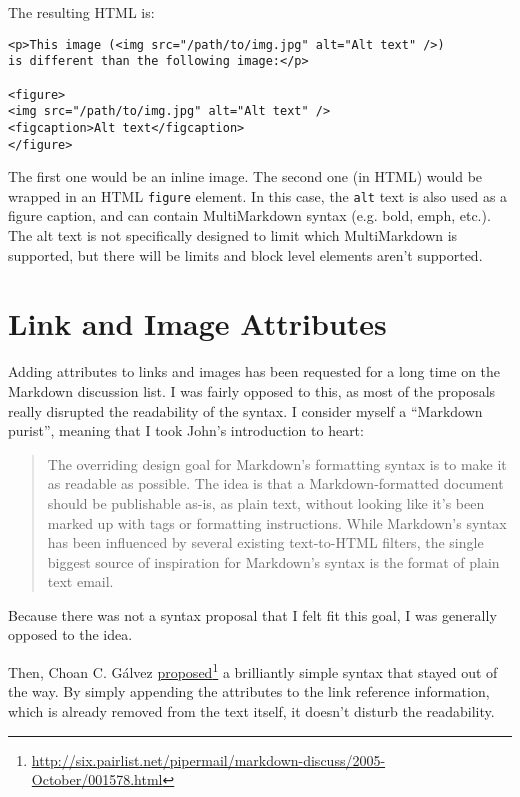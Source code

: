 The resulting HTML is:

\begin{verbatim}
<p>This image (<img src="/path/to/img.jpg" alt="Alt text" />)
is different than the following image:</p>

<figure>
<img src="/path/to/img.jpg" alt="Alt text" />
<figcaption>Alt text</figcaption>
</figure>
\end{verbatim}

The first one would be an inline image. The second one (in HTML) would be wrapped in an HTML \texttt{figure} element. In this case, the \texttt{alt} text is also used as a figure caption, and can contain MultiMarkdown syntax (e.g. bold, emph, etc.). The alt text is not specifically designed to limit which MultiMarkdown is supported, but there will be limits and block level elements aren't supported.

\section{Link and Image Attributes}
\label{linkandimageattributes}

Adding attributes to links and images has been requested for a long time on
the Markdown discussion list. I was fairly opposed to this, as most of the
proposals really disrupted the readability of the syntax. I consider myself a
``Markdown purist'', meaning that I took John's introduction to heart:

\begin{quote}
The overriding design goal for Markdown's formatting syntax is to make
it as readable as possible. The idea is that a Markdown-formatted
document should be publishable as-is, as plain text, without looking
like it's been marked up with tags or formatting instructions. While
Markdown's syntax has been influenced by several existing text-to-HTML
filters, the single biggest source of inspiration for Markdown's
syntax is the format of plain text email.
\end{quote}

Because there was not a syntax proposal that I felt fit this goal, I was generally opposed to the idea.

Then, Choan C. Gálvez \href{http://six.pairlist.net/pipermail/markdown-discuss/2005-October/001578.html}{proposed}\footnote{\href{http://six.pairlist.net/pipermail/markdown-discuss/2005-October/001578.html}{http:\slash \slash six.pairlist.net\slash pipermail\slash markdown-discuss\slash 2005-October\slash 001578.html}} a brilliantly simple syntax that
stayed out of the way. By simply appending the attributes to the link
reference information, which is already removed from the text itself, it
doesn't disturb the readability.

